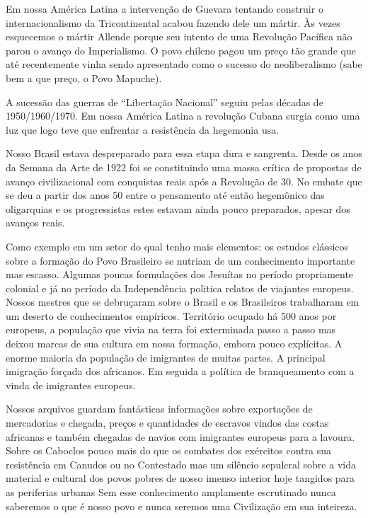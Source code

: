 Em nossa América Latina a intervenção de Guevara tentando construir o
internacionalismo da Tricontinental acabou fazendo dele um mártir. Às
vezes esquecemos o mártir Allende porque seu intento de uma Revolução
Pacífica não parou o avanço do Imperialismo. O povo chileno pagou um
preço tão grande que até recentemente vinha sendo apresentado como o
sucesso do neoliberalismo (sabe bem a que preço, o Povo Mapuche).

A sucessão das guerras de “Libertação Nacional” seguiu pelas décadas de
1950/1960/1970. Em nossa América Latina a revolução Cubana surgia como
uma luz que logo teve que enfrentar a resistência da hegemonia {\sc usa}.

Nosso Brasil estava despreparado para essa etapa dura e sangrenta. Desde
os anos da Semana da Arte de 1922 foi se constituindo uma massa crítica
de propostas de avanço civilizacional com conquistas reais após a
Revolução de 30. No embate que se deu a partir dos anos 50 entre o
pensamento até então hegemônico das oligarquias e os progressistas estes
estavam ainda pouco preparados, apesar dos avanços reais.

Como exemplo em um setor do qual tenho mais elementos: os estudos
clássicos sobre a formação do Povo Brasileiro se nutriam de um
conhecimento importante mas escasso. Algumas poucas formulações dos
Jesuítas no período propriamente colonial e já no período da
Independência politica relatos de viajantes europeus. Nossos mestres que
se debruçaram sobre o Brasil e os Brasileiros trabalharam em um deserto
de conhecimentos empíricos. Território ocupado há 500 anos por europeus,
a população que vivia na terra foi exterminada passo a passo mas deixou
marcas de sua cultura em nossa formação, embora pouco explícitas. A
enorme maioria da população de imigrantes de muitas partes. A principal
imigração forçada dos africanos. Em seguida a política de branqueamento
com a vinda de imigrantes europeus.

Nossos arquivos guardam fantásticas informações sobre exportações de
mercadorias e chegada, preços e quantidades de escravos vindos das
costas africanas e também chegadas de navios com imigrantes europeus
para a lavoura. Sobre os Caboclos pouco mais do que os combates dos
exércitos contra sua resistência em Canudos ou no Contestado mas um
silêncio sepulcral sobre a vida material e cultural dos povos pobres de
nosso imenso interior hoje tangidos para as periferias urbanas Sem esse
conhecimento amplamente escrutinado nunca saberemos o que é nosso povo e
nunca seremos uma Civilização em sua inteireza.

